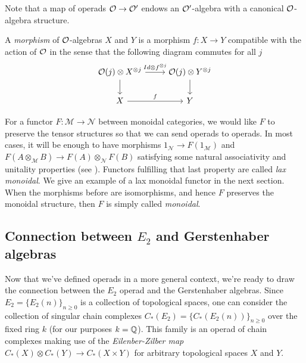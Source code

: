 \documentclass[TFM.tex]{subfiles}
\begin{document}
Note that a map of operads ${\mathcal O}\to {\mathcal O}'$ endows an ${\mathcal O}'$-algebra with a canonical ${\mathcal O}$-algebra structure.

\begin{defi}
	A \emph{morphism} of ${\mathcal O}$-algebras $X$ and $Y$ is a morphism $f:X\to Y$ compatible with the action of ${\mathcal O}$ in the sense that the following diagram commutes for all $j$
	\[
	\begin{tikzcd}
	\OO(j)\otimes X^{\otimes j}\arrow[r, "Id\otimes f^{\otimes j}"]\arrow[d] & 	\OO(j)\otimes Y^{\otimes j}\arrow[d]\\
	X\arrow[r, "f"] & Y
	\end{tikzcd}
	\]
	\end{defi}


For a functor $F:\mathscr{M}\to\mathscr{N}$ between monoidal categories, we would like $F$ to preserve the tensor structures so that we can send operads to operads. In most cases, it will be enough to have  morphisms $1_{\mathscr{N}}\to F(1_\mathscr{M})$ and $F(A\otimes_{\mathscr{M}}B)\to F(A)\otimes_{\mathscr{N}} F(B)$ satisfying some natural associativity and unitality properties (see \cite[Definition 6.4.1]{handbook}). Functors fulfilling that last property are called \emph{lax monoidal}. We give an example of a lax monoidal functor in the next section. When the morphisms before are isomorphisms, and hence $F$ preserves the monoidal structure, then $F$ is simply called \emph{monoidal}.

\subsection{Connection between $E_2$ and Gerstenhaber algebras}\label{zilber}

Now that we've defined operads in a more general context, we're ready to draw the connection between the $E_2$ operad and the Gerstenhaber algebras. Since $E_2=\{E_2(n)\}_{n\geq 0}$ is a collection of topological spaces, one can consider the collection of singular chain complexes $C_*(E_2)=\{C_*(E_2(n))\}_{n\geq 0}$ over the fixed ring $k$ (for our purposes $k=\mathbb{Q}$). This family is an operad of chain complexes making use of the \emph{Eilenber-Zilber map} \cite{EZ} $C_*(X)\otimes C_*(Y)\to C_*(X\times Y)$ for arbitrary topological spaces $X$ and $Y$. 
\end{document}
